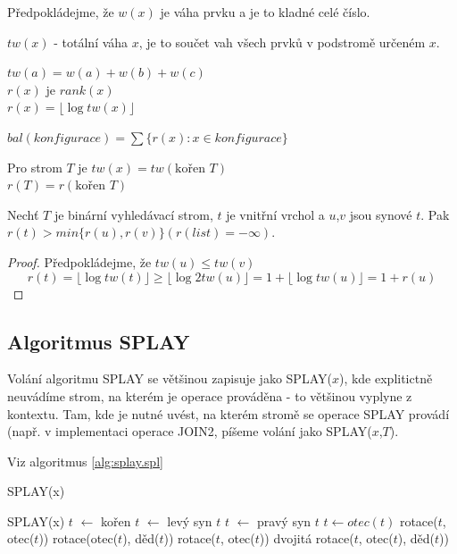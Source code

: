 Předpokládejme, že $w(x)$ je váha prvku a je to kladné celé číslo.
\par
$tw(x)$ - totální váha $x$, je to součet vah všech prvků v podstromě
určeném $x$.

\begin{priklad}

$tw(a) = w(a) + w(b) + w(c)$ \\

$r(x)$ je $rank(x)$ \\
$r(x) = \lfloor \log tw(x) \rfloor$

$bal(konfigurace) = \sum \{ r(x) : x \in konfigurace \}$

Pro strom $T$ je $tw(x) = tw(\text{kořen }T)$ \\
	       $r(T) = r(\text{kořen }T)$
\end{priklad}

\begin{lemma}
Nechť $T$ je binární vyhledávací strom, $t$ je vnitřní vrchol a $u$,$v$ jsou
synové $t$. Pak $r(t) > min\{r(u), r(v)\} (r(list) = -\infty)$.
\end{lemma}

\begin{proof}
Předpokládejme, že $tw(u) \leq tw(v)$\\
$$
r(t) = \lfloor \log tw(t) \rfloor \geq \lfloor \log 2tw(u) \rfloor =
1 + \lfloor \log tw(u) \rfloor = 1 + r(u)
$$
\end{proof}

\subsection{Algoritmus SPLAY}

Volání algoritmu SPLAY se většinou zapisuje jako SPLAY($x$), kde explitictně
neuvádíme strom, na kterém je operace prováděna - to většinou vyplyne z
kontextu. Tam, kde je nutné uvést, na kterém stromě se operace SPLAY
provádí (např. v implementaci operace JOIN2, píšeme volání jako 
SPLAY($x$,$T$).

Viz algoritmus \ref{alg:splay.spl}

\begin{algorithm}[!htb]
\caption{SPLAY(x)}
\label{alg:splay.spl}
\begin{algorithmic}
\STATE SPLAY(x)
\STATE $t$ $\leftarrow$ kořen
		\STATE $t$ $\leftarrow$ levý syn $t$
	\ELSE
		\STATE $t$ $\leftarrow$ pravý syn $t$
	\ENDIF
\ENDWHILE
{}
	\STATE $t \leftarrow otec(t)$
\ENDIF
{}
	  \STATE rotace($t$, otec($t$))
	\ELSE
		  \STATE rotace(otec($t$), děd($t$))
		  \STATE rotace($t$, otec($t$))
		\ELSE
		  \STATE dvojitá rotace($t$, otec($t$), děd($t$))
		\ENDIF
	\ENDIF
\ENDWHILE
\end{algorithmic}
\end{algorithm}

